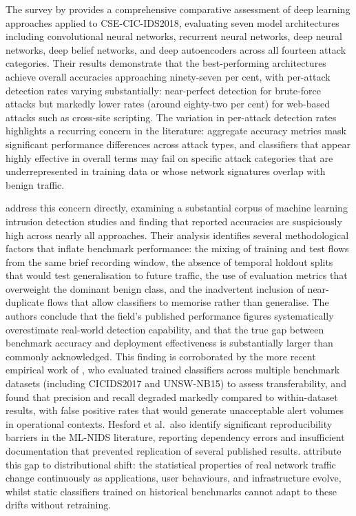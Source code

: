 \documentclass[../main.tex]{subfiles}
\begin{document}
The survey by \textcite{Ferrag2020} provides a comprehensive comparative assessment of deep learning approaches applied to CSE-CIC-IDS2018, evaluating seven model architectures including convolutional neural networks, recurrent neural networks, deep neural networks, deep belief networks, and deep autoencoders across all fourteen attack categories. Their results demonstrate that the best-performing architectures achieve overall accuracies approaching ninety-seven per cent, with per-attack detection rates varying substantially: near-perfect detection for brute-force attacks but markedly lower rates (around eighty-two per cent) for web-based attacks such as cross-site scripting. The variation in per-attack detection rates highlights a recurring concern in the literature: aggregate accuracy metrics mask significant performance differences across attack types, and classifiers that appear highly effective in overall terms may fail on specific attack categories that are underrepresented in training data or whose network signatures overlap with benign traffic.

\textcite{Leevy2020} address this concern directly, examining a substantial corpus of machine learning intrusion detection studies and finding that reported accuracies are suspiciously high across nearly all approaches. Their analysis identifies several methodological factors that inflate benchmark performance: the mixing of training and test flows from the same brief recording window, the absence of temporal holdout splits that would test generalisation to future traffic, the use of evaluation metrics that overweight the dominant benign class, and the inadvertent inclusion of near-duplicate flows that allow classifiers to memorise rather than generalise. The authors conclude that the field's published performance figures systematically overestimate real-world detection capability, and that the true gap between benchmark accuracy and deployment effectiveness is substantially larger than commonly acknowledged. This finding is corroborated by the more recent empirical work of \textcite{Hesford2024}, who evaluated trained classifiers across multiple benchmark datasets (including CICIDS2017 and UNSW-NB15) to assess transferability, and found that precision and recall degraded markedly compared to within-dataset results, with false positive rates that would generate unacceptable alert volumes in operational contexts. Hesford et al.\ also identify significant reproducibility barriers in the ML-NIDS literature, reporting dependency errors and insufficient documentation that prevented replication of several published results. \textcite{Hesford2024} attribute this gap to distributional shift: the statistical properties of real network traffic change continuously as applications, user behaviours, and infrastructure evolve, whilst static classifiers trained on historical benchmarks cannot adapt to these drifts without retraining.
\end{document}
